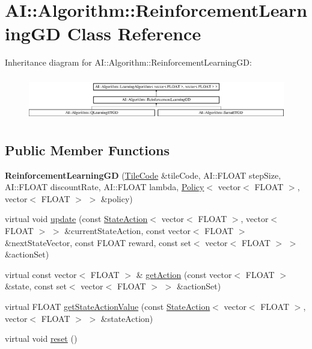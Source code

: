 \hypertarget{classAI_1_1Algorithm_1_1ReinforcementLearningGD}{\section{A\-I\-:\-:Algorithm\-:\-:Reinforcement\-Learning\-G\-D Class Reference}
\label{classAI_1_1Algorithm_1_1ReinforcementLearningGD}
}
Inheritance diagram for A\-I\-:\-:Algorithm\-:\-:Reinforcement\-Learning\-G\-D\-:\begin{figure}[H]
\begin{center}
\leavevmode
\includegraphics[height=1.931035cm]{classAI_1_1Algorithm_1_1ReinforcementLearningGD}
\end{center}
\end{figure}
\subsection*{Public Member Functions}
\begin{DoxyCompactItemize}
\item 
\hypertarget{classAI_1_1Algorithm_1_1ReinforcementLearningGD_aff76294c39401be6fbcc30970f4ccdff}{{\bfseries Reinforcement\-Learning\-G\-D} (\hyperlink{classAI_1_1Algorithm_1_1TileCode}{Tile\-Code} \&tile\-Code, A\-I\-::\-F\-L\-O\-A\-T step\-Size, A\-I\-::\-F\-L\-O\-A\-T discount\-Rate, A\-I\-::\-F\-L\-O\-A\-T lambda, \hyperlink{classAI_1_1Algorithm_1_1Policy}{Policy}$<$ vector$<$ F\-L\-O\-A\-T $>$, vector$<$ F\-L\-O\-A\-T $>$ $>$ \&policy)}\label{classAI_1_1Algorithm_1_1ReinforcementLearningGD_aff76294c39401be6fbcc30970f4ccdff}

\item 
virtual void \hyperlink{classAI_1_1Algorithm_1_1ReinforcementLearningGD_afca8d60ac090dec611f3834c0e8872c0}{update} (const \hyperlink{classAI_1_1StateAction}{State\-Action}$<$ vector$<$ F\-L\-O\-A\-T $>$, vector$<$ F\-L\-O\-A\-T $>$ $>$ \&current\-State\-Action, const vector$<$ F\-L\-O\-A\-T $>$ \&next\-State\-Vector, const F\-L\-O\-A\-T reward, const set$<$ vector$<$ F\-L\-O\-A\-T $>$ $>$ \&action\-Set)
\item 
virtual const vector$<$ F\-L\-O\-A\-T $>$ \& \hyperlink{classAI_1_1Algorithm_1_1ReinforcementLearningGD_a97a8fe122f39d0b47a9df496502c2555}{get\-Action} (const vector$<$ F\-L\-O\-A\-T $>$ \&state, const set$<$ vector$<$ F\-L\-O\-A\-T $>$ $>$ \&action\-Set)
\item 
virtual F\-L\-O\-A\-T \hyperlink{classAI_1_1Algorithm_1_1ReinforcementLearningGD_a937edc4d2b11025bccbd450163155660}{get\-State\-Action\-Value} (const \hyperlink{classAI_1_1StateAction}{State\-Action}$<$ vector$<$ F\-L\-O\-A\-T $>$, vector$<$ F\-L\-O\-A\-T $>$ $>$ \&state\-Action)
\item 
virtual void \hyperlink{classAI_1_1Algorithm_1_1ReinforcementLearningGD_ad6f2fa8bc762d6760e9c61a132ccd098}{reset} ()
\end{DoxyCompactItemize}
